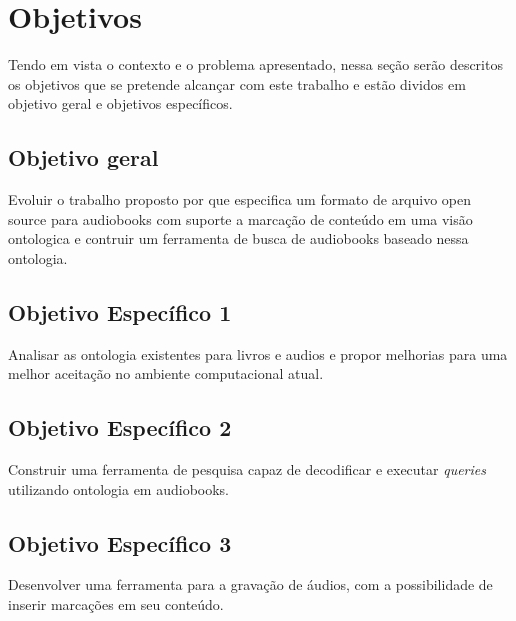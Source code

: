\chapter{Objetivos}\label{cap2}

Tendo em vista o contexto e o problema apresentado, nessa seção serão descritos os objetivos que se pretende alcançar com este trabalho e estão dividos em objetivo geral e objetivos específicos.

\section{Objetivo geral}

Evoluir o trabalho proposto por \cite{herbert} que especifica um formato de arquivo open source para audiobooks com suporte a marcação de conteúdo em uma visão ontologica e contruir um ferramenta de busca de audiobooks baseado nessa ontologia.

\section{Objetivo Específico 1}

Analisar as ontologia existentes para livros e audios e propor melhorias para uma melhor aceitação no ambiente computacional atual.

\section{Objetivo Específico 2}

Construir uma ferramenta de pesquisa capaz de decodificar e executar \textit{queries} utilizando ontologia em audiobooks.

\section{Objetivo Específico 3}

Desenvolver uma ferramenta para a gravação de áudios, com a possibilidade de inserir marcações em seu conteúdo.




 





